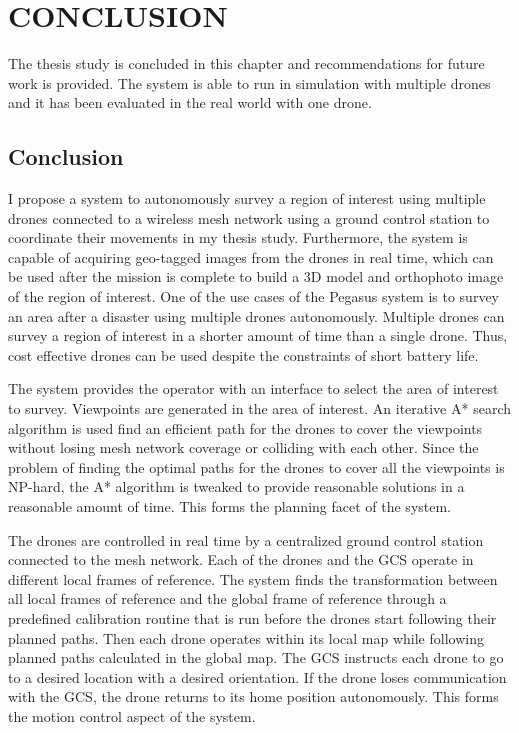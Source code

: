 \setlength{\parindent}{0pt} 
\setlength{\parskip}{0mm}
\setlength{\baselineskip}{1.6em}

\chapter{CONCLUSION}
\label{ch:conclusion}

The thesis study is concluded in this chapter and recommendations for future work is provided. The system is able to run in simulation with multiple drones and it has been evaluated in the real world with one drone. 

\section{Conclusion}
I propose a system to autonomously survey a region of interest using multiple drones connected to a wireless mesh network using a ground control station to coordinate their movements in my thesis study. Furthermore, the system is capable of acquiring geo-tagged images from the drones in real time, which can be used after the mission is complete to build a 3D model and orthophoto image of the region of interest. One of the use cases of the Pegasus system is to survey an area after a disaster using multiple drones autonomously. Multiple drones can survey a region of interest in a shorter amount of time than a single drone. Thus, cost effective drones can be used despite the constraints of short battery life.

The system provides the operator with an interface to select the area of interest to survey. Viewpoints are generated in the area of interest. An iterative A* search algorithm is used find an efficient path for the drones to cover the viewpoints without losing mesh network coverage or colliding with each other. Since the problem of finding the optimal paths for the drones to cover all the viewpoints is NP-hard, the A* algorithm is tweaked to provide reasonable solutions in a reasonable amount of time. This forms the planning facet of the system.

The drones are controlled in real time by a centralized ground control station connected to the mesh network. Each of the drones and the GCS operate in different local frames of reference. The system finds the transformation between all local frames of reference and the global frame of reference through a predefined calibration routine that is run before the drones start following their planned paths. Then each drone operates within its local map while following planned paths calculated in the global map. The GCS instructs each drone to go to a desired location with a desired orientation. If the drone loses communication with the GCS, the drone returns to its home position autonomously. This forms the motion control aspect of the system.

